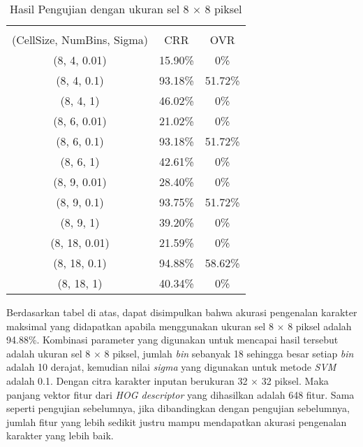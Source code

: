 \begin{longtable}[c]{|c|c|c|}
	\caption{Hasil Pengujian dengan ukuran sel 8 $\times$ 8 piksel}
	\label{tab:HasilPengujianSel8}\\
	\hline
	\begin{tabular}[c]{@{}c@{}}Parameter\\ (CellSize, NumBins, Sigma)\end{tabular} & CRR     & OVR     \\ \hline
	\endhead
	(8, 4, 0.01)                                                                   & 15.90\% & 0\% \\ \hline
	(8, 4, 0.1)                                                                    & 93.18\% & 51.72\%     \\ \hline
	(8, 4, 1)                                                                      & 46.02\% & 0\%     \\ \hline
	(8, 6, 0.01)                                                                   & 21.02\% & 0\%  \\ \hline
	(8, 6, 0.1)                                                                    & 93.18\% & 51.72\%     \\ \hline
	(8, 6, 1)                                                                      & 42.61\% & 0\%     \\ \hline
	(8, 9, 0.01)                                                                   & 28.40\% & 0\%  \\ \hline
	(8, 9, 0.1)                                                                    & 93.75\% & 51.72\%     \\ \hline
	(8, 9, 1)                                                                      & 39.20\% & 0\%     \\ \hline
	(8, 18, 0.01)                                                                  & 21.59\% & 0\%  \\ \hline
	(8, 18, 0.1)                                                                   & {\color[HTML]{FE0000} 94.88\%} & {\color[HTML]{FE0000} 58.62\%}     \\ \hline
	(8, 18, 1)                                                                     & 40.34\% & 0\%     \\ \hline
\end{longtable}
\noindent Berdasarkan tabel di atas, dapat disimpulkan bahwa akurasi pengenalan karakter maksimal yang didapatkan apabila menggunakan ukuran sel 8 $\times$ 8 piksel adalah 94.88\%. Kombinasi parameter yang digunakan untuk mencapai hasil tersebut adalah ukuran sel 8 $\times$ 8 piksel, jumlah \textit{bin} sebanyak 18 sehingga besar setiap \textit{bin} adalah 10 derajat, kemudian nilai \textit{sigma} yang digunakan untuk metode \textit{SVM} adalah 0.1. Dengan citra karakter inputan berukuran 32 $\times$ 32 piksel. Maka panjang vektor fitur dari \textit{HOG descriptor} yang dihasilkan adalah 648 fitur. Sama seperti pengujian sebelumnya, jika dibandingkan dengan pengujian sebelumnya, jumlah fitur yang lebih sedikit justru mampu mendapatkan akurasi pengenalan karakter yang lebih baik.

